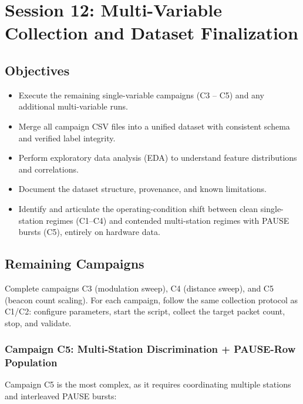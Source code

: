 \documentclass[11pt,letterpaper]{article}
\begin{document}
	\newpage
	\section{Session 12: Multi-Variable Collection and Dataset Finalization}
	\label{sec:dataset}

	\subsection{Objectives}

	\begin{itemize}[leftmargin=2em]
		\item Execute the remaining single-variable campaigns (C3 -- C5) and any additional multi-variable runs.
		\item Merge all campaign CSV files into a unified dataset with consistent schema and verified label integrity.
		\item Perform exploratory data analysis (EDA) to understand feature distributions and correlations.
		\item Document the dataset structure, provenance, and known limitations.
		\item Identify and articulate the operating-condition shift between clean single-station regimes (C1--C4) and contended multi-station regimes with PAUSE bursts (C5), entirely on hardware data.
	\end{itemize}

	\subsection{Remaining Campaigns}

	Complete campaigns C3 (modulation sweep), C4 (distance sweep), and C5 (beacon count scaling). For each campaign, follow the same collection protocol as C1/C2: configure parameters, start the script, collect the target packet count, stop, and validate.

	\subsubsection{Campaign C5: Multi-Station Discrimination + PAUSE-Row Population}

	Campaign C5 is the most complex, as it requires coordinating multiple stations and interleaved PAUSE bursts:
\end{document}
